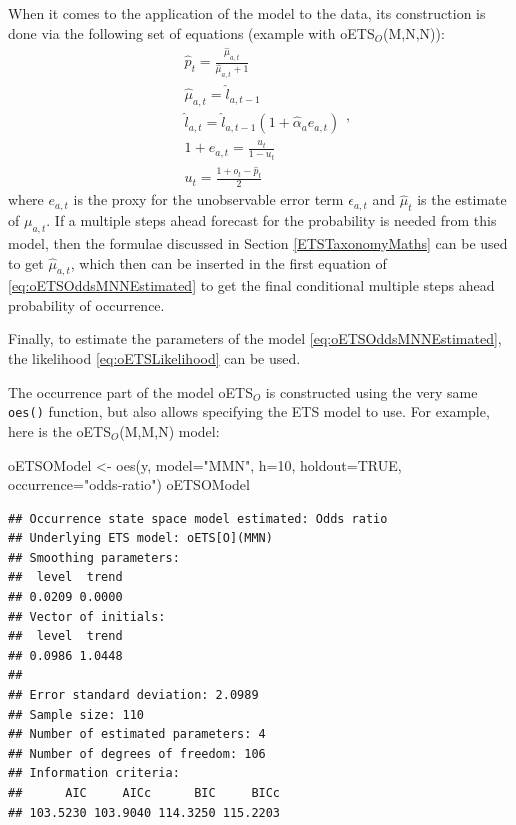 \documentclass[
]{book}
\newenvironment{Shaded}{\begin{snugshade}}{\end{snugshade}}
\newcommand{\AttributeTok}[1]{\textcolor[rgb]{0.77,0.63,0.00}{#1}}
\newcommand{\ConstantTok}[1]{\textcolor[rgb]{0.00,0.00,0.00}{#1}}
\newcommand{\DecValTok}[1]{\textcolor[rgb]{0.00,0.00,0.81}{#1}}
\newcommand{\FunctionTok}[1]{\textcolor[rgb]{0.00,0.00,0.00}{#1}}
\newcommand{\NormalTok}[1]{#1}
\newcommand{\OtherTok}[1]{\textcolor[rgb]{0.56,0.35,0.01}{#1}}
\newcommand{\StringTok}[1]{\textcolor[rgb]{0.31,0.60,0.02}{#1}}
\theoremstyle{definition}
\theoremstyle{definition}
\theoremstyle{definition}
\theoremstyle{definition}
\theoremstyle{remark}
\begin{document}
When it comes to the application of the model to the data, its construction is done via the following set of equations (example with oETS\(_O\)(M,N,N)):
\begin{equation}
\begin{aligned}
& \hat{p}_t = \frac{\hat{\mu}_{a,t}}{\hat{\mu}_{a,t}+1} \\
& \hat{\mu}_{a,t} = \hat{l}_{a,t-1} \\
& \hat{l}_{a,t} = \hat{l}_{a,t-1}( 1  + \hat{\alpha}_{a} e_{a,t}) \\
& 1+e_{a,t} = \frac{u_t}{1-u_t} \\
& u_{t} = \frac{1 + o_t -\hat{p}_t}{2}
\end{aligned},
\label{eq:oETSOddsMNNEstimated}
\end{equation}
where \(e_{a,t}\) is the proxy for the unobservable error term \(\epsilon_{a,t}\) and \(\hat{\mu}_t\) is the estimate of \(\mu_{a,t}\). If a multiple steps ahead forecast for the probability is needed from this model, then the formulae discussed in Section \ref{ETSTaxonomyMaths} can be used to get \(\hat{\mu}_{a,t}\), which then can be inserted in the first equation of \eqref{eq:oETSOddsMNNEstimated} to get the final conditional multiple steps ahead probability of occurrence.

Finally, to estimate the parameters of the model \eqref{eq:oETSOddsMNNEstimated}, the likelihood \eqref{eq:oETSLikelihood} can be used.

The occurrence part of the model oETS\(_O\) is constructed using the very same \texttt{oes()} function, but also allows specifying the ETS model to use. For example, here is the oETS\(_O\)(M,M,N) model:

\begin{Shaded}
\begin{Highlighting}[]
\NormalTok{oETSOModel }\OtherTok{\textless{}{-}} \FunctionTok{oes}\NormalTok{(y, }\AttributeTok{model=}\StringTok{"MMN"}\NormalTok{, }\AttributeTok{h=}\DecValTok{10}\NormalTok{, }\AttributeTok{holdout=}\ConstantTok{TRUE}\NormalTok{,}
                  \AttributeTok{occurrence=}\StringTok{"odds{-}ratio"}\NormalTok{)}
\NormalTok{oETSOModel}
\end{Highlighting}
\end{Shaded}

\begin{verbatim}
## Occurrence state space model estimated: Odds ratio
## Underlying ETS model: oETS[O](MMN)
## Smoothing parameters:
##  level  trend 
## 0.0209 0.0000 
## Vector of initials:
##  level  trend 
## 0.0986 1.0448 
## 
## Error standard deviation: 2.0989
## Sample size: 110
## Number of estimated parameters: 4
## Number of degrees of freedom: 106
## Information criteria: 
##      AIC     AICc      BIC     BICc 
## 103.5230 103.9040 114.3250 115.2203
\end{verbatim}
\end{document}
